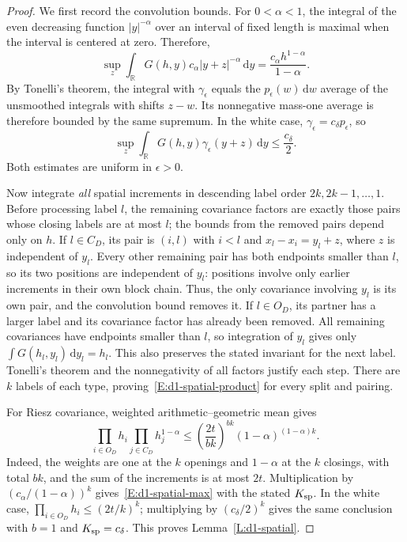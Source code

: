 \documentclass[12pt]{article}
\numberwithin{equation}{section}
\theoremstyle{definition}
\newcommand{\R}{\mathbb{R}}
\newcommand{\ud}{\,\mathrm{d}}
\begin{document}
\begin{proof}
  We first record the convolution bounds. For $0<\alpha<1$, the
  integral of the even decreasing function $|y|^{-\alpha}$ over an
  interval of fixed length is maximal when the interval is centered
  at zero. Therefore,
  \[
    \sup_z\int_\R G(h,y)c_\alpha|y+z|^{-\alpha}\ud y
    =\frac{c_\alpha h^{1-\alpha}}{1-\alpha}.
  \]
  By Tonelli's theorem, the integral with $\gamma_\epsilon$ equals
  the $p_\epsilon(w)\ud w$ average of the unsmoothed integrals with
  shifts $z-w$. Its nonnegative mass-one average is therefore bounded
  by the same supremum. In the white case,
  $\gamma_\epsilon=c_\delta p_\epsilon$, so
  \[
    \sup_z\int_\R G(h,y)\gamma_\epsilon(y+z)\ud y
    \le\frac{c_\delta}{2}.
  \]
  Both estimates are uniform in $\epsilon>0$.

  Now integrate \emph{all} spatial increments in descending label
  order $2k,2k-1,\ldots,1$. Before processing label $l$, the remaining
  covariance factors are exactly those pairs whose closing labels are
  at most $l$; the bounds from the removed pairs depend only on $h$.
  If $l\in C_D$, its pair is $(i,l)$ with $i<l$ and
  $x_l-x_i=y_l+z$, where $z$ is independent of $y_l$. Every other
  remaining pair has both endpoints smaller than $l$, so its two
  positions are independent of $y_l$: positions involve only earlier
  increments in their own block chain. Thus, the only covariance
  involving $y_l$ is its own pair, and the convolution bound removes it.
  If $l\in O_D$, its partner has a larger label and its covariance
  factor has already been removed. All remaining covariances have
  endpoints smaller than $l$, so integration of $y_l$ gives only
  $\int G(h_l,y_l)\ud y_l=h_l$. This also preserves the stated
  invariant for the next label. Tonelli's theorem and the nonnegativity
  of all factors justify each step. There are $k$ labels of each type,
  proving~\eqref{E:d1-spatial-product} for every split and pairing.

  For Riesz covariance, weighted arithmetic--geometric mean gives
  \[
    \prod_{i\in O_D}h_i\prod_{j\in C_D}h_j^{1-\alpha}
    \le\left(\frac{2t}{bk}\right)^{bk}
    (1-\alpha)^{(1-\alpha)k}.
  \]
  Indeed, the weights are one at the $k$ openings and $1-\alpha$
  at the $k$ closings, with total $bk$, and the sum of the increments
  is at most $2t$. Multiplication by
  $(c_\alpha/(1-\alpha))^k$ gives~\eqref{E:d1-spatial-max} with
  the stated $K_{\rm sp}$. In the white case,
  $\prod_{i\in O_D}h_i\le(2t/k)^k$; multiplying by
  $(c_\delta/2)^k$ gives the same conclusion with $b=1$ and
  $K_{\rm sp}=c_\delta$. This proves Lemma~\ref{L:d1-spatial}.
\end{proof}
\end{document}
